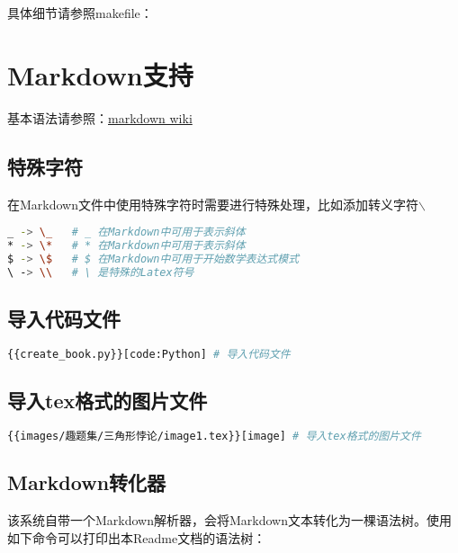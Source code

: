 \documentclass[12pt, letterpaper]{ctexrep}
\begin{document}
具体细节请参照makefile：



\chapter{Markdown支持}

基本语法请参照：\href{https://simplemde.com/markdown-guide}{markdown wiki}

\section{特殊字符}

在Markdown文件中使用特殊字符时需要进行特殊处理，比如添加转义字符$\backslash$
\begin{lstlisting}[language=Bash]
_ -> \_   # _ 在Markdown中可用于表示斜体
* -> \*   # * 在Markdown中可用于表示斜体
$ -> \$   # $ 在Markdown中可用于开始数学表达式模式
\ -> \\   # \ 是特殊的Latex符号
\end{lstlisting}

\section{导入代码文件}

\begin{lstlisting}[language=Bash]
{{create_book.py}}[code:Python] # 导入代码文件
\end{lstlisting}



\section{导入tex格式的图片文件}

\begin{lstlisting}[language=Bash]
{{images/趣题集/三角形悖论/image1.tex}}[image] # 导入tex格式的图片文件
\end{lstlisting}

\begin{center}

\end{center}

\section{Markdown转化器}
该系统自带一个Markdown解析器，会将Markdown文本转化为一棵语法树。使用如下命令可以打印出本Readme文档的语法树：
\end{document}
